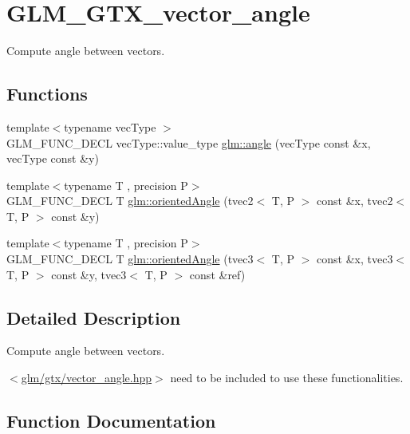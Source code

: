 \hypertarget{group__gtx__vector__angle}{}\section{G\+L\+M\+\_\+\+G\+T\+X\+\_\+vector\+\_\+angle}
\label{group__gtx__vector__angle}


Compute angle between vectors.  


\subsection*{Functions}
\begin{DoxyCompactItemize}
\item 
{\footnotesize template$<$typename vec\+Type $>$ }\\G\+L\+M\+\_\+\+F\+U\+N\+C\+\_\+\+D\+E\+C\+L vec\+Type\+::value\+\_\+type \hyperlink{group__gtx__vector__angle_gab8691008a2536b681b711211816c14f7}{glm\+::angle} (vec\+Type const \&x, vec\+Type const \&y)
\item 
{\footnotesize template$<$typename T , precision P$>$ }\\G\+L\+M\+\_\+\+F\+U\+N\+C\+\_\+\+D\+E\+C\+L T \hyperlink{group__gtx__vector__angle_ga82a19d474be13c92c7b10caab42a5a72}{glm\+::oriented\+Angle} (tvec2$<$ T, P $>$ const \&x, tvec2$<$ T, P $>$ const \&y)
\item 
{\footnotesize template$<$typename T , precision P$>$ }\\G\+L\+M\+\_\+\+F\+U\+N\+C\+\_\+\+D\+E\+C\+L T \hyperlink{group__gtx__vector__angle_ga7254dba112eff55f55f9544f41cb9ece}{glm\+::oriented\+Angle} (tvec3$<$ T, P $>$ const \&x, tvec3$<$ T, P $>$ const \&y, tvec3$<$ T, P $>$ const \&ref)
\end{DoxyCompactItemize}


\subsection{Detailed Description}
Compute angle between vectors. 

$<$\hyperlink{vector__angle_8hpp}{glm/gtx/vector\+\_\+angle.\+hpp}$>$ need to be included to use these functionalities. 

\subsection{Function Documentation}
\hypertarget{group__gtx__vector__angle_gab8691008a2536b681b711211816c14f7}{}
